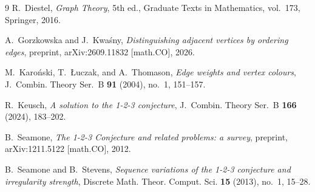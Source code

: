 \documentclass[11pt,a4paper]{article}
\begin{document}
\begin{thebibliography}{9}
R.~Diestel, \emph{Graph Theory}, 5th ed., Graduate Texts in Mathematics, vol.~173, Springer, 2016.

A.~Gorzkowska and J.~Kwa\'sny, \emph{Distinguishing adjacent vertices by ordering edges}, preprint, arXiv:2609.11832 [math.CO], 2026.

M.~Karo\'nski, T.~{\L}uczak, and A.~Thomason, \emph{Edge weights and vertex colours}, J.~Combin. Theory Ser.~B \textbf{91} (2004), no.~1, 151--157.

R.~Keusch, \emph{A solution to the 1-2-3 conjecture}, J.~Combin. Theory Ser.~B \textbf{166} (2024), 183--202.

B.~Seamone, \emph{The 1-2-3 Conjecture and related problems: a survey}, preprint, arXiv:1211.5122 [math.CO], 2012.

B.~Seamone and B.~Stevens, \emph{Sequence variations of the 1-2-3 conjecture and irregularity strength}, Discrete Math. Theor. Comput. Sci. \textbf{15} (2013), no.~1, 15--28.
\end{thebibliography}
\end{document}
